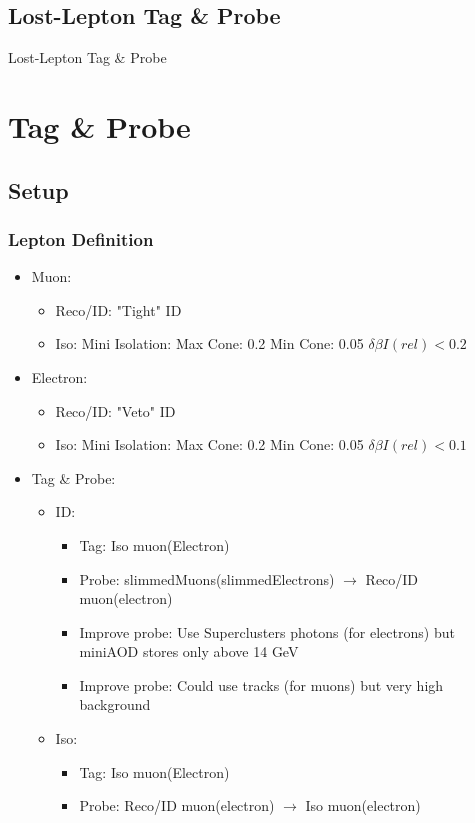 \documentclass{beamer}
\begin{document}
\subsection{Lost-Lepton Tag \& Probe}
\begin{frame}
 \begin{block}{}
 \centering
 \Large Lost-Lepton Tag \& Probe
 \end{block}

\end{frame}

\section{Tag \& Probe}
\subsection{Setup}
\begin{frame}
\frametitle{Lepton Definition}
\begin{itemize}
 \item Muon:
 \begin{itemize}
  \item Reco/ID: "Tight" ID
  \item Iso: Mini Isolation: Max Cone: 0.2 Min Cone: 0.05 $\delta \beta I(rel)<0.2$
 \end{itemize}
  \item Electron:
 \begin{itemize}
  \item Reco/ID: "Veto" ID
  \item Iso: Mini Isolation: Max Cone: 0.2 Min Cone: 0.05 $\delta \beta I(rel)<0.1$
 \end{itemize}
 \item Tag \& Probe:
 \begin{itemize}
 \item ID:
 \begin{itemize}
  \item Tag: Iso muon(Electron)
  \item Probe: slimmedMuons(slimmedElectrons) $\rightarrow$ Reco/ID muon(electron)
  \item Improve probe: Use Superclusters photons (for electrons) but miniAOD stores only above  14 GeV
  \item Improve probe: Could use tracks (for muons) but very high background
 \end{itemize}
  \item Iso:
 \begin{itemize}
  \item Tag: Iso muon(Electron)
  \item Probe: Reco/ID muon(electron) $\rightarrow$ Iso muon(electron)
  
 \end{itemize}

 \end{itemize}
\end{itemize}
\end{frame}
\end{document}
